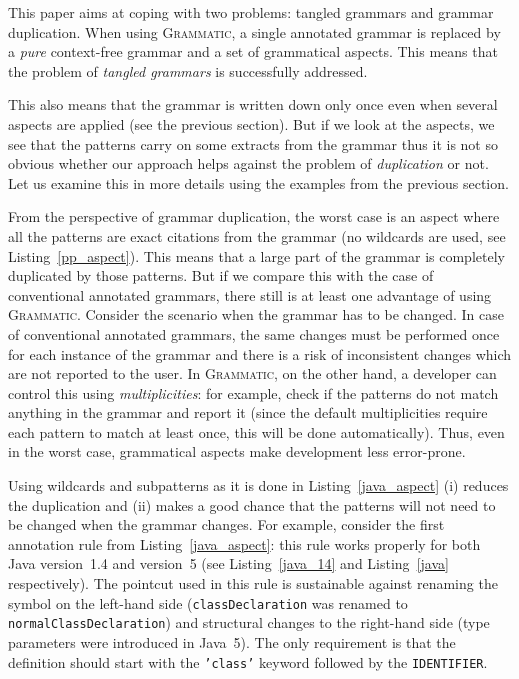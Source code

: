\documentclass[10pt]{llncs}
\newcommand{\lstref}[1]{Listing~\ref{#1}}
\newcommand{\tool}[1]{\textsc{#1}}
\newcommand{\Grammatic}[0]{\tool{Grammatic}}
\begin{document}
This paper aims at coping with two problems: tangled grammars and grammar duplication. 
When using \Grammatic{}, a single annotated grammar is replaced by a \emph{pure} context-free grammar and a set of grammatical aspects. This means that the problem of \emph{tangled grammars} is successfully addressed.

This also means that the grammar is written down only once even when several aspects are applied (see the previous section). But if we look at the aspects, we see that the patterns carry on some extracts from the grammar thus it is not so obvious whether our approach helps against the problem of \emph{duplication} or not. Let us examine this in more details using the examples from the previous section.

From the perspective of grammar duplication, the worst case is an aspect where all the patterns are exact citations from the grammar (no wildcards are used, see \lstref{pp_aspect}). This means that a large part of the grammar is completely duplicated by those patterns. But if we compare this with the case of conventional annotated grammars, there still is at least one advantage of using \Grammatic{}. Consider the scenario when the grammar has to be changed. In case of conventional annotated grammars, the same changes must be performed once for each instance of the grammar and there is a risk of inconsistent changes which are not reported to the user. In \Grammatic{}, on the other hand, a developer can control this using \emph{multiplicities}: for example, check if the patterns do not match anything in the grammar and report it (since the default multiplicities require each pattern to match at least once, this will be done automatically). Thus, even in the worst case, grammatical aspects make development less error-prone.

Using wildcards and subpatterns as it is done in \lstref{java_aspect} (i) reduces the duplication and (ii) makes a good chance that the patterns will not need to be changed when the grammar changes. For example, consider the first annotation rule from \lstref{java_aspect}: this rule works properly for both Java version~1.4 and version~5 (see \lstref{java_14} and \lstref{java} respectively). The pointcut used in this rule is sustainable against renaming the symbol on the left-hand side (\texttt{classDeclaration} was renamed to \texttt{normalClassDeclaration}) and structural changes to the right-hand side (type parameters were introduced in Java~5). The only requirement is that the definition should start with the \texttt{'class'} keyword followed by the \texttt{IDENTIFIER}.
\end{document}
